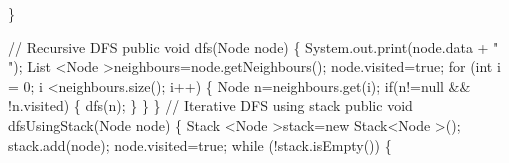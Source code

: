 \documentclass{report}
\begin{document}
        \}
\newline        
 

	// Recursive DFS\newline
	public  void dfs(Node node)\newline
	\{\newline
    	\hspace*{0.8cm}System.out.print(node.data + " ");\newline
		\hspace*{0.8cm}List \textless Node \textgreater neighbours=node.getNeighbours();\newline
        \hspace*{0.8cm}node.visited=true;\newline
		\hspace*{0.8cm}for (int i = 0; i \textless neighbours.size(); i++) \{\newline
			\hspace*{1cm}Node n=neighbours.get(i);\newline
			\hspace*{1cm}if(n!=null \&\&  !n.visited)\newline
			\hspace*{1cm}\{\newline
				\hspace*{1.5cm}dfs(n);\newline
			\hspace*{1cm}\}\newline
		\hspace*{0.8cm}\}\newline
	\}\newline
 \newline
	// Iterative DFS using stack\newline
	public  void dfsUsingStack(Node node)\newline
	\{\newline
		\hspace*{0.8cm}Stack \textless Node \textgreater stack=new  Stack\textless Node \textgreater ();\newline
		\hspace*{0.8cm}stack.add(node);\newline
		\hspace*{0.8cm}node.visited=true;\newline
		\hspace*{0.8cm}while (!stack.isEmpty())\newline
		\hspace*{0.8cm}\{\newline
\end{document}
